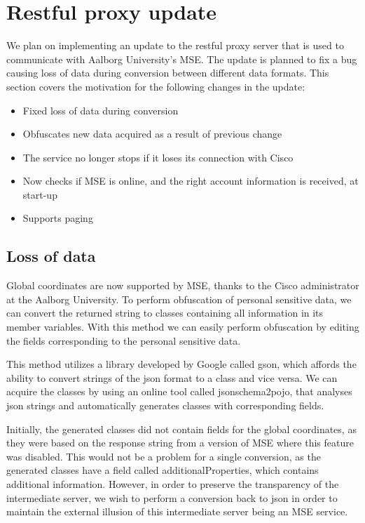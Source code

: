 \section{Restful proxy update}
We plan on implementing an update to the restful proxy server that is used to communicate with Aalborg University's MSE. The update is planned to fix a bug causing loss of data during conversion between different data formats. This section covers the motivation for the following changes in the update:

\begin{itemize}
\item Fixed loss of data during conversion
\item Obfuscates new data acquired as a result of previous change
\item The service no longer stops if it loses its connection with Cisco
\item Now checks if MSE is online, and the right account information is received, at start-up
\item Supports paging
\end{itemize}

\subsection{Loss of data}
Global coordinates are now supported by MSE, thanks to the Cisco administrator at the Aalborg University. To perform obfuscation of personal sensitive data, we can convert the returned string to classes containing all information in its member variables. With this method we can easily perform obfuscation by editing the fields corresponding to the personal sensitive data. 

This method utilizes a library developed by Google called gson\cite{gson}, which affords the ability to convert strings of the json format to a class and vice versa. We can acquire the classes by using an online tool called jsonschema2pojo\cite{jsonschematwopojo}, that analyses json strings and automatically generates classes with corresponding fields.

Initially, the generated classes did not contain fields for the global coordinates, as they were based on the response string from a version of MSE where this feature was disabled. This would not be a problem for a single conversion, as the generated classes have a field called additionalProperties, which contains additional information. However, in order to preserve the transparency of the intermediate server, we wish to perform a conversion back to json in order to maintain the external illusion of this intermediate server being an MSE service.

